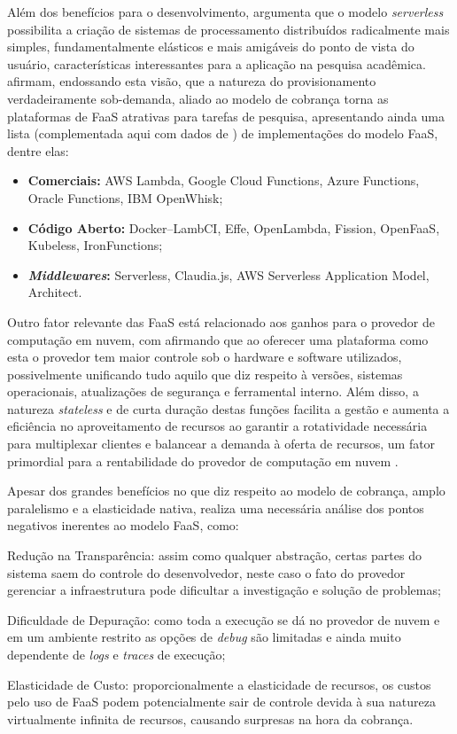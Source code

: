 \documentclass[english,brazilian]{UNISINOSmonografia} %
\begin{document}
Além dos benefícios para o desenvolvimento,  argumenta que o modelo \textit{serverless} possibilita a criação de sistemas de processamento distribuídos radicalmente mais simples, fundamentalmente elásticos e mais amigáveis do ponto de vista do usuário, características interessantes para a aplicação na pesquisa acadêmica.
 afirmam, endossando esta visão, que a natureza do provisionamento verdadeiramente sob-demanda, aliado ao modelo de cobrança torna as plataformas de FaaS atrativas para tarefas de pesquisa, apresentando ainda uma lista (complementada aqui com dados de ) de implementações do modelo FaaS, dentre elas:
\begin{itemize}
	\item \textbf{Comerciais:} AWS Lambda, Google Cloud Functions, Azure Functions, Oracle Functions, IBM OpenWhisk;
	\item \textbf{Código Aberto:} Docker--LambCI, Effe, OpenLambda, Fission, OpenFaaS, Kubeless, IronFunctions;
	\item \textbf{\textit{Middlewares}:} Serverless, Claudia.js, AWS Serverless Application Model, Architect.
\end{itemize}


Outro fator relevante das FaaS está relacionado aos ganhos para o provedor de computação em nuvem, com  afirmando que ao oferecer uma plataforma como esta o provedor tem maior controle sob o hardware e software utilizados, possivelmente unificando tudo aquilo que diz respeito à versões, sistemas operacionais, atualizações de segurança e ferramental interno.
Além disso, a natureza \textit{stateless} e de curta duração destas funções facilita a gestão e aumenta a eficiência no aproveitamento de recursos ao garantir a rotatividade necessária para multiplexar clientes e balancear a demanda à oferta de recursos, um fator primordial para a rentabilidade do provedor de computação em nuvem \cite{Shankar2018}.


Apesar dos grandes benefícios no que diz respeito ao modelo de cobrança, amplo paralelismo e a elasticidade nativa,  realiza uma necessária análise dos pontos negativos inerentes ao modelo FaaS, como: 
\begin{inparaenum} 
	\item Redução na Transparência: assim como qualquer abstração, certas partes do sistema saem do controle do desenvolvedor, neste caso o fato do provedor gerenciar a infraestrutura pode dificultar a investigação e solução de problemas;
	\item Dificuldade de Depuração: como toda a execução se dá no provedor de nuvem e em um ambiente restrito as opções de \textit{debug} são limitadas e ainda muito dependente de \textit{logs} e \textit{traces} de execução;
	\item Elasticidade de Custo: proporcionalmente a elasticidade de recursos, os custos pelo uso de FaaS podem potencialmente sair de controle devida à sua natureza virtualmente infinita de recursos, causando surpresas na hora da cobrança.
\end{inparaenum}
\end{document}
